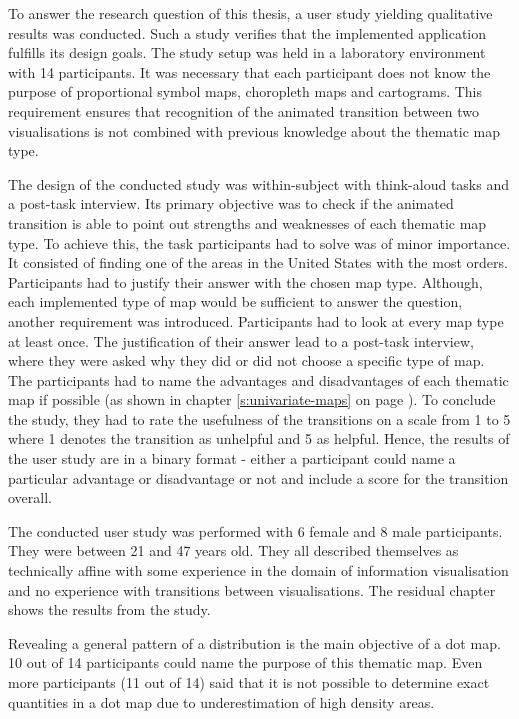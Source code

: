 To answer the research question of this thesis, a user study yielding qualitative results was conducted. Such a study verifies that the implemented application fulfills its design goals.
The study setup was held in a laboratory environment with 14 participants. It was necessary that each participant does not know the purpose of proportional symbol maps, choropleth maps and cartograms. This requirement ensures that recognition of the animated transition between two visualisations is not combined with previous knowledge about the thematic map type.

The design of the conducted study was within-subject with think-aloud tasks and a post-task interview. Its primary objective was to check if the animated transition is able to point out strengths and weaknesses of each thematic map type. To achieve this, the task participants had to solve was of minor importance. It consisted of finding one of the areas in the United States with the most orders. Participants had to justify their answer with the chosen map type. Although, each implemented type of map would be sufficient to answer the question, another requirement was introduced. Participants had to look at every map type at least once. The justification of their answer lead to a post-task interview, where they were asked why they did or did not choose a specific type of map. The participants had to name the advantages and disadvantages of each thematic map if possible (as shown in chapter \ref{s:univariate-maps} on page \pageref{s:univariate-maps}).
To conclude the study, they had to rate the usefulness of the transitions on a scale from 1 to 5 where 1 denotes the transition as unhelpful and 5 as helpful. Hence, the results of the user study are in a binary format - either a participant could name a particular advantage or disadvantage or not and include a score for the transition overall.

The conducted user study was performed with 6 female and 8 male participants. They were between 21 and 47 years old. They all described themselves as technically affine with some experience in the domain of information visualisation and no experience with transitions between visualisations. The residual chapter shows the results from the study.

Revealing a general pattern of a distribution is the main objective of a dot map. 10 out of 14 participants could name the purpose of this thematic map. Even more participants (11 out of 14) said that it is not possible to determine exact quantities in a dot map due to underestimation of high density areas.

